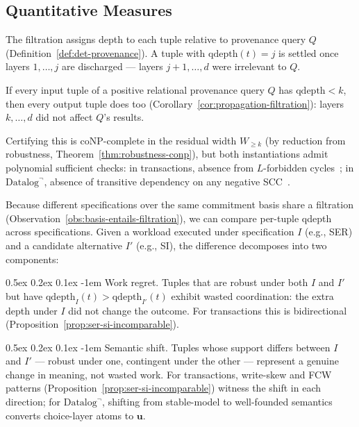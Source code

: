 \documentclass[acmsmall,review,anonymous]{acmart}
\makeatletter
\renewcommand{\paragraph}{\@startsection{paragraph}{4}{\z@}%
  {0.5ex \@plus 0.2ex \@minus 0.1ex}%
  {-1em}%
  {\normalfont\normalsize\bfseries}}
\theoremstyle{remark}
\numberwithin{definition}{section}
\numberwithin{theorem}{section}
\numberwithin{lemma}{section}
\numberwithin{corollary}{section}
\numberwithin{remark}{section}
\numberwithin{example}{section}
\numberwithin{observation}{section}
\numberwithin{assumption}{section}
\makeatother
\begin{document}
\subsection{Quantitative Measures}

The filtration assigns depth to each tuple relative to provenance
query $Q$ (Definition~\ref{def:det-provenance}).
A tuple with $\mathrm{qdepth}(t) = j$ is settled once layers
$1, \ldots, j$ are discharged --- layers $j{+}1, \ldots, d$ were
irrelevant to $Q$.

\begin{proposition}
  \label{prop:depth-bound}
  If every input tuple of a positive relational provenance query $Q$
  has $\mathrm{qdepth} < k$, then every output tuple does too
  (Corollary~\ref{cor:propagation-filtration}): layers $k, \ldots, d$
  did not affect $Q$'s results.
\end{proposition}

\noindent
Certifying this is coNP-complete in the residual width
$W_{\geq k}$ (by reduction from robustness,
Theorem~\ref{thm:robustness-conp}), but both instantiations admit
polynomial sufficient checks:
in transactions, absence from $L$-forbidden
cycles~\cite{adya1999weak}; in $\mbox{Datalog}^\neg$,
absence of transitive dependency on any negative
SCC~\cite{gebser2012asp}.

Because different specifications over the same commitment basis share
a filtration (Observation~\ref{obs:basis-entails-filtration}), we can
compare per-tuple qdepth across specifications.
Given a workload executed under specification $I$ (e.g., SER) and a
candidate alternative $I'$ (e.g., SI), the difference decomposes into
two components:

\paragraph{Work regret.}
Tuples that are robust under both $I$ and $I'$ but have
$\mathrm{qdepth}_I(t) > \mathrm{qdepth}_{I'}(t)$ exhibit wasted
coordination: the extra depth under $I$ did not change the outcome.
For transactions this is bidirectional
(Proposition~\ref{prop:ser-si-incomparable}).

\paragraph{Semantic shift.}
Tuples whose support differs between $I$ and $I'$ --- robust under
one, contingent under the other --- represent a genuine change in
meaning, not wasted work.
For transactions, write-skew and FCW patterns
(Proposition~\ref{prop:ser-si-incomparable}) witness the shift in
each direction; for $\mbox{Datalog}^\neg$, shifting from stable-model
to well-founded semantics converts choice-layer atoms to $\mathbf{u}$.
\end{document}

